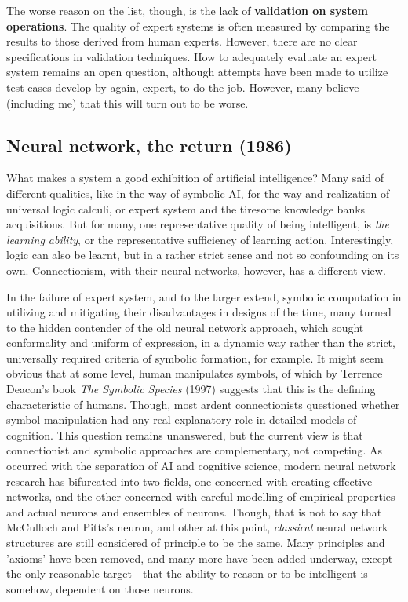 The worse reason on the list, though, is the lack of \textbf{validation on system operations}. The quality of expert systems is often measured by comparing the results to those derived from human experts. However, there are no clear specifications in validation techniques. How to adequately evaluate an expert system remains an open question, although attempts have been made to utilize test cases develop by again, expert, to do the job. However, many believe (including me) that this will turn out to be worse. 

\subsection{Neural network, the return (1986)}

What makes a system a good exhibition of artificial intelligence? Many said of different qualities, like in the way of symbolic AI, for the way and realization of universal logic calculi, or expert system and the tiresome knowledge banks acquisitions. But for many, one representative quality of being intelligent, is \textit{the learning ability}, or the representative sufficiency of learning action. Interestingly, logic can also be learnt, but in a rather strict sense and not so confounding on its own. Connectionism, with their neural networks, however, has a different view. 

In the failure of expert system, and to the larger extend, symbolic computation in utilizing and mitigating their disadvantages in designs of the time, many turned to the hidden contender of the old neural network approach, which sought conformality and uniform of expression, in a dynamic way rather than the strict, universally required criteria of symbolic formation, for example. It might seem obvious that at some level, human manipulates symbols, of which by Terrence Deacon's book \textit{The Symbolic Species} (1997) suggests that this is the defining characteristic of humans. Though, most ardent connectionists questioned whether symbol manipulation had any real explanatory role in detailed models of cognition. This question remains unanswered, but the current view is that connectionist and symbolic approaches are complementary, not competing. As occurred with the separation of AI and cognitive science, modern neural network research has bifurcated into two fields, one concerned with creating effective networks, and the other concerned with careful modelling of empirical properties and actual neurons and ensembles of neurons. Though, that is not to say that McCulloch and Pitts's neuron, and other at this point, \textit{classical} neural network structures are still considered of principle to be the same. Many principles and 'axioms' have been removed, and many more have been added underway, except the only reasonable target - that the ability to reason or to be intelligent is somehow, dependent on those neurons. 

